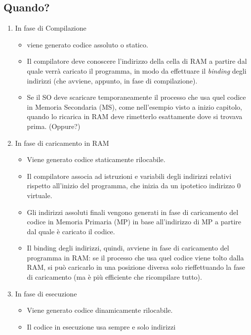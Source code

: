 \subsection{Quando?}
\begin{enumerate}
    \item In fase di Compilazione 
        \begin{itemize}
        \item viene generato codice assoluto o statico.
        \item Il compilatore deve conoscere l'indirizzo della cella di
        RAM a partire dal quale verrà caricato il programma,
        in modo da effettuare il \textit{binding} degli indirizzi
        (che avviene, appunto, in fase di compilazione).
        \item Se il SO deve scaricare temporaneamente il processo
        che usa quel codice in Memoria Secondaria (MS), come
        nell'esempio visto a inizio capitolo, quando lo ricarica
        in RAM deve rimetterlo esattamente dove si trovava
        prima. (Oppure?)
        \end{itemize}
    \item  In fase di caricamento in RAM
        \begin{itemize}
        \item Viene generato codice staticamente rilocabile.
        \item Il compilatore associa ad istruzioni e variabili degli
        indirizzi relativi rispetto all'inizio del programma,
        che inizia da un ipotetico indirizzo 0 virtuale.
        \item Gli indirizzi assoluti finali vengono generati in fase di
        caricamento del codice in Memoria Primaria (MP) in base all'indirizzo di
        MP a partire dal quale è caricato il codice.
        \item Il binding degli indirizzi, quindi, avviene in fase di
        caricamento del programma in RAM: se il processo che
        usa quel codice viene tolto dalla RAM, si può caricarlo
        in una posizione diversa solo rieffettuando la fase di
        caricamento (ma è più efficiente che ricompilare tutto).
        \end{itemize}
    \item In fase di esecuzione
        \begin{itemize}
        \item Viene generato codice dinamicamente rilocabile.
            \item Il codice in esecuzione usa sempre e solo indirizzi

\end{itemize}
\end{enumerate}
